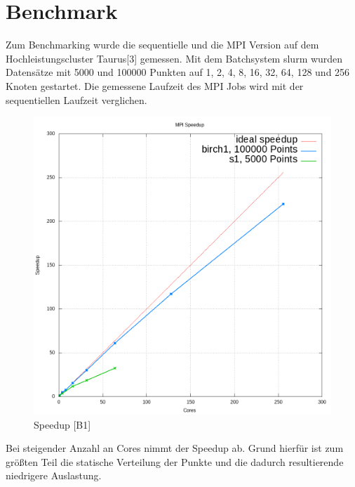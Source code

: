\section{Benchmark}
	Zum Benchmarking wurde die sequentielle und die MPI Version auf dem Hochleistungscluster Taurus[3] gemessen. Mit dem Batchsystem slurm wurden Datensätze mit
	5000 und 100000 Punkten auf 1, 2, 4, 8, 16, 32, 64, 128 und 256 Knoten gestartet. Die gemessene Laufzeit des MPI Jobs wird mit der sequentiellen
	Laufzeit verglichen.\\
	\begin{figure}[H] \centering
		\includegraphics[scale=0.61]{../meanshift/output/pics/speedup.png} 
		\caption{Speedup [B1]}
	\end{figure}
	Bei steigender Anzahl an Cores nimmt der Speedup ab. Grund hierfür ist zum größten Teil die statische Verteilung der Punkte und die dadurch
	resultierende niedrigere Auslastung.\\
	\newpage
